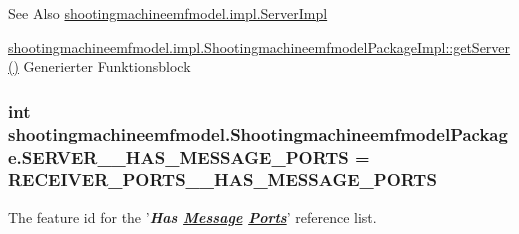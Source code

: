 \begin{DoxySeeAlso}{See Also}
\hyperlink{classshootingmachineemfmodel_1_1impl_1_1_server_impl}{shootingmachineemfmodel.\-impl.\-Server\-Impl} 

\hyperlink{classshootingmachineemfmodel_1_1impl_1_1_shootingmachineemfmodel_package_impl_acf844f025872ba16560467f31ef67236}{shootingmachineemfmodel.\-impl.\-Shootingmachineemfmodel\-Package\-Impl\-::get\-Server()} Generierter Funktionsblock 
\end{DoxySeeAlso}
\hypertarget{interfaceshootingmachineemfmodel_1_1_shootingmachineemfmodel_package_abce144db281b035c08fdb258b3890b5a}{
\subsubsection[{S\-E\-R\-V\-E\-R\-\_\-\-\_\-\-H\-A\-S\-\_\-\-M\-E\-S\-S\-A\-G\-E\-\_\-\-P\-O\-R\-T\-S}]{\setlength{\rightskip}{0pt plus 5cm}int shootingmachineemfmodel.\-Shootingmachineemfmodel\-Package.\-S\-E\-R\-V\-E\-R\-\_\-\-\_\-\-H\-A\-S\-\_\-\-M\-E\-S\-S\-A\-G\-E\-\_\-\-P\-O\-R\-T\-S = {\bf R\-E\-C\-E\-I\-V\-E\-R\-\_\-\-P\-O\-R\-T\-S\-\_\-\-\_\-\-H\-A\-S\-\_\-\-M\-E\-S\-S\-A\-G\-E\-\_\-\-P\-O\-R\-T\-S}}}\label{interfaceshootingmachineemfmodel_1_1_shootingmachineemfmodel_package_abce144db281b035c08fdb258b3890b5a}
The feature id for the '{\itshape {\bfseries Has \hyperlink{interfaceshootingmachineemfmodel_1_1_message}{Message} \hyperlink{interfaceshootingmachineemfmodel_1_1_ports}{Ports}}}' reference list.

